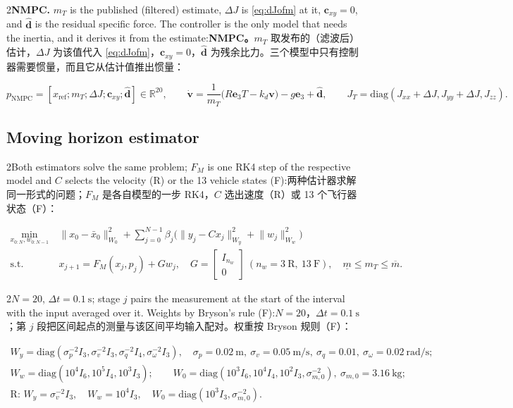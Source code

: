 \documentclass[10pt,a4paper]{article}
\numberwithin{equation}{section}
\newcommand{\dJ}{\Delta J}
\newcommand{\mT}{m_T}
\newcommand{\Jt}{J_T}
\newcommand{\ev}{\bm{e}_3}
\newcommand{\pair}[2]{\begin{paracol}{2}#1\switchcolumn #2\end{paracol}}
\newcommand{\bsub}[2]{\needspace{8\baselineskip}\subsection{#1\quad{\normalfont #2}}}
\begin{document}
\pair{\textbf{NMPC.} $\mT$ is the published (filtered) estimate, $\dJ$ is
\eqref{eq:dJofm} at it, $\bm c_{xy}=0$, and $\hat{\bm d}$ is the residual
specific force. The controller is the only model that needs the inertia, and it
derives it from the estimate:}
{\textbf{NMPC。}$\mT$ 取发布的（滤波后）估计，$\dJ$ 为该值代入 \eqref{eq:dJofm}，$\bm c_{xy}=0$，$\hat{\bm d}$ 为残余比力。三个模型中只有控制器需要惯量，而且它从估计值推出惯量：}
\begin{equation}
p_{\mathrm{NMPC}}=[x_{\mathrm{ref}};\mT;\dJ;\bm c_{xy};\hat{\bm d}]\in\mathbb R^{20},\qquad
\dot{\bm v}=\frac{1}{\mT}\bigl(R\ev T-k_d\bm v\bigr)-g\ev+\hat{\bm d},\qquad
\Jt=\mathrm{diag}(J_{xx}+\dJ,J_{yy}+\dJ,J_{zz}).
\label{eq:predmodel}
\end{equation}

\bsub{Moving horizon estimator}{滑动时域估计器}
\pair{Both estimators solve the same problem; $F_M$ is one RK4 step of the
respective model and $C$ selects the velocity (R) or the 13 vehicle states (F):}
{两种估计器求解同一形式的问题；$F_M$ 是各自模型的一步 RK4，$C$ 选出速度（R）或 13 个飞行器状态（F）：}
\begin{equation}
\begin{aligned}
\min_{x_{0:N},w_{0:N-1}}\ & \lVert x_0-\bar x_0\rVert^2_{W_0}
+\sum_{j=0}^{N-1}\beta_j\bigl(\lVert y_j-Cx_j\rVert^2_{W_y}+\lVert w_j\rVert^2_{W_w}\bigr)\\
\text{s.t.}\ & x_{j+1}=F_M(x_j,p_j)+Gw_j,\quad G=\begin{bmatrix}I_{n_w}\\0\end{bmatrix}\ (n_w=3\ \text{R},\ 13\ \text{F}),\quad
\underline m\le\mT\le\overline m.
\end{aligned}
\label{eq:mhe}
\end{equation}
\pair{$N=20$, $\Delta t=\SI{0.1}{\second}$; stage $j$ pairs the measurement at
the start of the interval with the input averaged over it. Weights by Bryson's
rule (F):}
{$N=20$，$\Delta t=\SI{0.1}{\second}$；第 $j$ 段把区间起点的测量与该区间平均输入配对。权重按 Bryson 规则（F）：}
\begin{equation}
\begin{gathered}
W_y=\mathrm{diag}(\sigma_p^{-2}I_3,\sigma_v^{-2}I_3,\sigma_q^{-2}I_4,\sigma_\omega^{-2}I_3),\quad
\sigma_p=\SI{0.02}{\meter},\ \sigma_v=\SI{0.05}{\meter\per\second},\ \sigma_q=0.01,\ \sigma_\omega=\SI{0.02}{\radian\per\second};\\
W_w=\mathrm{diag}(10^4I_6,10^5I_4,10^3I_3);\qquad
W_0=\mathrm{diag}(10^3I_6,10^4I_4,10^2I_3,\sigma_{m,0}^{-2}),\ \sigma_{m,0}=\SI{3.16}{\kg};\\
\text{R: }W_y=\sigma_v^{-2}I_3,\quad W_w=10^4I_3,\quad W_0=\mathrm{diag}(10^3I_3,\sigma_{m,0}^{-2}).
\end{gathered}
\end{equation}
\end{document}
